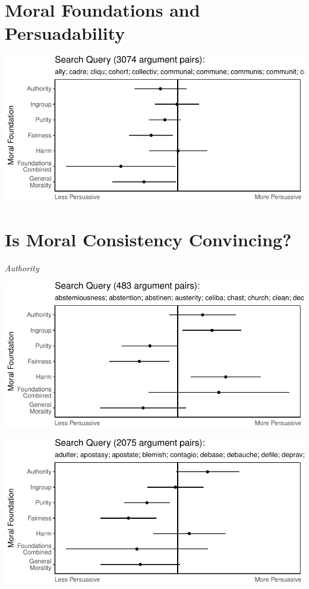 \documentclass[11pt,]{article}
\begin{document}
\section{Moral Foundations and
Persuadability}\label{moral-foundations-and-persuadability}

\includegraphics{prelim_files/figure-latex/unnamed-chunk-3-1.pdf}

\section{Is Moral Consistency
Convincing?}\label{is-moral-consistency-convincing}

\emph{Authority}

\includegraphics{prelim_files/figure-latex/unnamed-chunk-5-1.pdf}

\includegraphics{prelim_files/figure-latex/unnamed-chunk-6-1.pdf}
\end{document}
